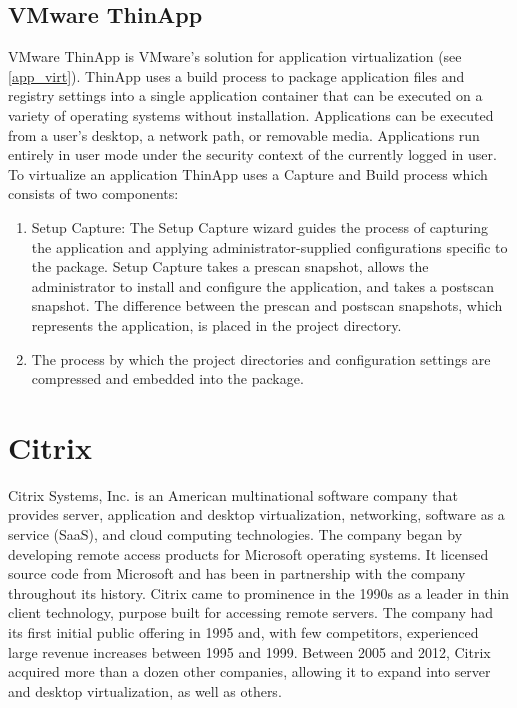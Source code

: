 \subsection{VMware ThinApp}
VMware ThinApp is VMware's solution for application virtualization (see \ref{app_virt}). ThinApp uses a build process to package application files and registry settings into a single application container that can be executed on a variety of operating systems without installation. Applications can be executed from a user's desktop, a network path, or removable media. Applications run entirely in user mode under the security context of the currently logged in user. To virtualize an application ThinApp uses a Capture and Build process which consists of two components:
\begin{enumerate}
\item Setup Capture: The Setup Capture wizard guides the process of capturing the application and applying administrator-supplied configurations specific to the package. Setup Capture takes a prescan snapshot, allows the administrator to install and configure the application, and takes a postscan snapshot. The difference between the prescan and postscan snapshots, which represents the application, is placed in the project directory.
\item The process by which the project directories and configuration settings are compressed and embedded into the package.
\end{enumerate}

\section{Citrix}
Citrix Systems, Inc. is an American multinational software company that provides server, application and desktop virtualization, networking, software as a service (SaaS), and cloud computing technologies. The company began by developing remote access products for Microsoft operating systems. It licensed source code from Microsoft and has been in partnership with the company throughout its history. Citrix came to prominence in the 1990s as a leader in thin client technology, purpose built for accessing remote servers. The company had its first initial public offering in 1995 and, with few competitors, experienced large revenue increases between 1995 and 1999. Between 2005 and 2012, Citrix acquired more than a dozen other companies, allowing it to expand into server and desktop virtualization, as well as others.

